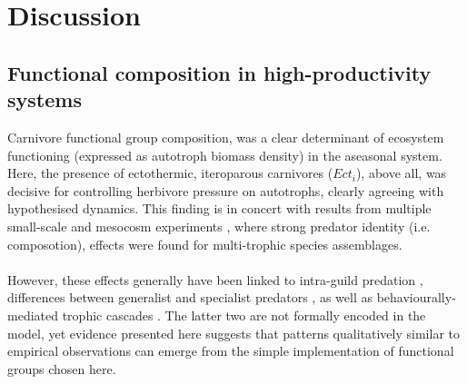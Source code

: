 \chapter{Discussion}
\label{chap:dis}
%
\section{Functional composition in high-productivity systems}
Carnivore functional group composition, was a clear determinant of ecosystem functioning (expressed as autotroph biomass density) in the aseasonal system. 
Here, the presence of ectothermic, iteroparous carnivores ($Ect_i$), above all, was decisive for controlling herbivore pressure on autotrophs, clearly agreeing with hypothesised dynamics. 
This finding is in concert with results from multiple small-scale and mesocosm experiments \citep[e.g.][]{Finke2005, OConnor2008, Sanders2011}, where strong predator identity (i.e. composotion), effects were found for multi-trophic species assemblages.\\\\
However, these effects generally have been  linked to intra-guild predation \citep{Ives2005}, differences between  generalist and specialist predators \citep{Duffy2007, Sanders2011}, as well as behaviourally-mediated trophic cascades \citep{Beschta2009, Schmitz2015}. 
The latter two are not formally encoded in the model, yet evidence presented here suggests that patterns qualitatively similar to empirical observations can emerge from the simple implementation of functional groups chosen here. 
